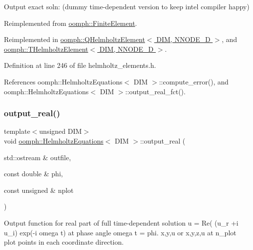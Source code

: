 Output exact soln\+: (dummy time-\/dependent version to keep intel compiler happy) 



Reimplemented from \hyperlink{classoomph_1_1FiniteElement_a2a8426dccd57b927be0ae0eec00d0479}{oomph\+::\+Finite\+Element}.



Reimplemented in \hyperlink{classoomph_1_1QHelmholtzElement_ad9aeaf3b84064897747f46590f4f87e3}{oomph\+::\+Q\+Helmholtz\+Element$<$ D\+I\+M, N\+N\+O\+D\+E\+\_\+D $>$}, and \hyperlink{classoomph_1_1THelmholtzElement_a043894a71e2508acf4a34b04469ec64e}{oomph\+::\+T\+Helmholtz\+Element$<$ D\+I\+M, N\+N\+O\+D\+E\+\_\+D $>$}.



Definition at line 246 of file helmholtz\+\_\+elements.\+h.



References oomph\+::\+Helmholtz\+Equations$<$ D\+I\+M $>$\+::compute\+\_\+error(), and oomph\+::\+Helmholtz\+Equations$<$ D\+I\+M $>$\+::output\+\_\+real\+\_\+fct().

\mbox{\label{classoomph_1_1HelmholtzEquations_a391092039be116f402d1495284b49e1e}} 
\subsubsection{\texorpdfstring{output\+\_\+real()}{output\_real()}}
{\footnotesize\ttfamily template$<$unsigned D\+IM$>$ \\
void \hyperlink{classoomph_1_1HelmholtzEquations}{oomph\+::\+Helmholtz\+Equations}$<$ D\+IM $>$\+::output\+\_\+real (\begin{DoxyParamCaption}\item[{std\+::ostream \&}]{outfile,  }\item[{const double \&}]{phi,  }\item[{const unsigned \&}]{nplot }\end{DoxyParamCaption})}



Output function for real part of full time-\/dependent solution u = Re( (u\+\_\+r +i u\+\_\+i) exp(-\/i omega t) at phase angle omega t = phi. x,y,u or x,y,z,u at n\+\_\+plot plot points in each coordinate direction. 

